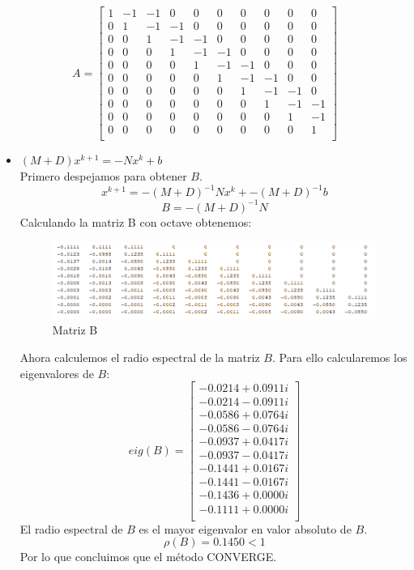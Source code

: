     $$A=\begin{bmatrix}
    1&-1&-1&0&0&0&0&0&0&0\\
    0&1&-1&-1&0&0&0&0&0&0\\
    0&0&1&-1&-1&0&0&0&0&0\\
    0&0&0&1&-1&-1&0&0&0&0\\
    0&0&0&0&1&-1&-1&0&0&0\\
    0&0&0&0&0&1&-1&-1&0&0\\
    0&0&0&0&0&0&1&-1&-1&0\\
    0&0&0&0&0&0&0&1&-1&-1\\
    0&0&0&0&0&0&0&0&1&-1\\
    0&0&0&0&0&0&0&0&0&1\\
    \end{bmatrix}$$
\begin{itemize}
    \item $(M+D)x^{k+1}=-Nx^k + b$ \\
    Primero despejamos para obtener $B$.
    $$x^{k+1}=-(M+D)^{-1}Nx^k + -(M+D)^{-1}b$$
    $$B=-(M+D)^{-1}N$$
    Calculando la matriz B con octave obtenemos:
   \begin{figure}[H]
                \centering
                \includegraphics[width=1.1\textwidth]{matrix_images/b1.PNG}
                \caption{Matriz B}
        \end{figure}
    Ahora calculemos el radio espectral de la matriz $B$. Para ello calcularemos los eigenvalores de $B$:
    $$eig(B)=\begin{bmatrix}
    -0.0214 + 0.0911i\\
  -0.0214 - 0.0911i\\
  -0.0586 + 0.0764i\\
  -0.0586 - 0.0764i\\
  -0.0937 + 0.0417i\\
  -0.0937 - 0.0417i\\
  -0.1441 + 0.0167i\\
  -0.1441 - 0.0167i\\
  -0.1436 + 0.0000i\\
  -0.1111 + 0.0000i\\
    \end{bmatrix}
    $$
    El radio espectral de $B$ es el mayor eigenvalor en valor absoluto de $B$.
    $$\rho (B) = 0.1450 <1$$
    Por lo que concluimos que el método CONVERGE.
    

\end{itemize}
